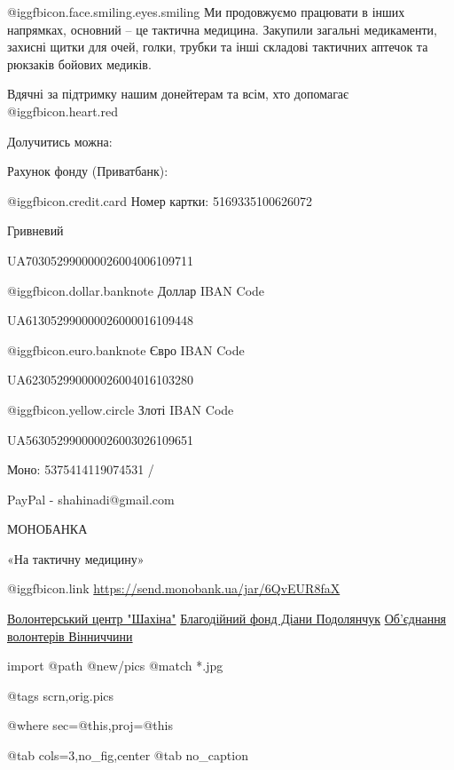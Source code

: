 @igg{fbicon.face.smiling.eyes.smiling} Ми продовжуємо працювати в інших
напрямках, основний – це тактична медицина.  Закупили загальні медикаменти,
захисні щитки для очей, голки, трубки та інші складові тактичних аптечок та
рюкзаків бойових медиків. 

Вдячні за підтримку нашим донейтерам та всім, хто допомагає @igg{fbicon.heart.red}

Долучитись можна:

Рахунок фонду (Приватбанк):\par
 @igg{fbicon.credit.card} Номер картки: 5169335100626072\par
Гривневий\par
UA703052990000026004006109711\par
 @igg{fbicon.dollar.banknote} Доллар IBAN Code\par
UA613052990000026000016109448\par
 @igg{fbicon.euro.banknote} Євро IBAN Code\par
UA623052990000026004016103280\par
 @igg{fbicon.yellow.circle} Злоті IBAN Code\par
UA563052990000026003026109651\par
Моно: 5375414119074531 /\par
PayPal - shahinadi@gmail.com\par
МОНОБАНКА \par
«На тактичну медицину» \par
 @igg{fbicon.link}  \url{https://send.monobank.ua/jar/6QvEUR8faX }\par

\obeycr
\href{https://www.facebook.com/profile.php?id=100081304876181}{Волонтерський центр "Шахіна"}
\href{https://www.facebook.com/shahinadi111}{Благодійний фонд Діани Подолянчук}
\href{https://www.facebook.com/groups/884456588253468/}{Об'єднання волонтерів Вінниччини}
\restorecr


\ifcmt
  import
    @path @new/pics
    @match *.jpg

    @tags scrn,orig.pics

    @where sec=@this,proj=@this
  
    @tab cols=3,no_fig,center
    @tab no_caption
\fi


